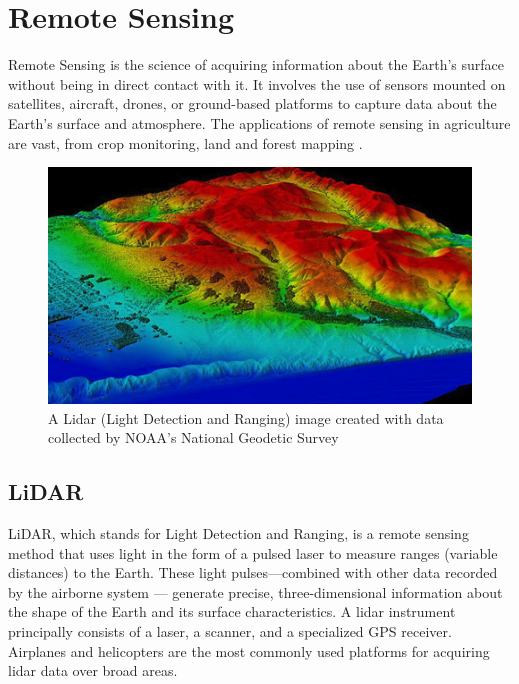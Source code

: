 \documentclass[conference]{IEEEtran}
\begin{document}
\section{Remote Sensing}
Remote Sensing is the science of acquiring information about the Earth's surface without being in direct contact with it. It involves the use of sensors mounted on satellites, aircraft, drones, or ground-based platforms to capture data about the Earth's surface and atmosphere. The applications of remote sensing in agriculture are vast, from crop monitoring, land and forest mapping \cite{forestMapping}.

\begin{figure}
    \centering
    \includegraphics[width=\linewidth]{images/remote-sensing.png}
    \caption{A Lidar (Light Detection and Ranging) image created with data collected by NOAA's National Geodetic Survey}
    \label{fig:remote-sensing}
\end{figure}

\subsection{LiDAR}
LiDAR, which stands for Light Detection and Ranging, is a remote sensing method that uses light in the form of a pulsed laser to measure ranges (variable distances) to the Earth. These light pulses—combined with other data recorded by the airborne system — generate precise, three-dimensional information about the shape of the Earth and its surface characteristics. 
A lidar instrument principally consists of a laser, a scanner, and a specialized GPS receiver. Airplanes and helicopters are the most commonly used platforms for acquiring lidar data over broad areas. \cite{collis1970lidar}
\end{document}
